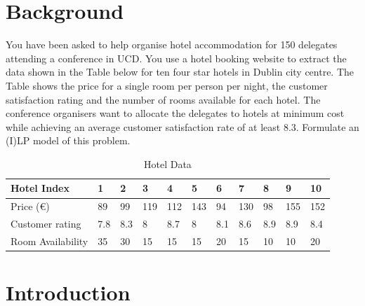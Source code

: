 \documentclass[paper=a4, fontsize=11pt]{scrartcl} %
\begin{document}
\section{Background}
You have been asked to help organise hotel accommodation for 150 delegates
attending a conference in UCD. You use a hotel booking website to extract the data
shown in the Table below for ten four star hotels in Dublin city centre. The Table
shows the price for a single room per person per night, the customer satisfaction
rating and the number of rooms available for each hotel. The conference organisers
want to allocate the delegates to hotels at minimum cost while achieving an average
customer satisfaction rate of at least 8.3. Formulate an (I)LP model of this problem. 

\begin{table}[ht]
\centering
\begin{tabular}{@{}|l|l|l|l|l|l|l|l|l|l|l|@{}}
\toprule
Hotel Index       & 1   & 2   & 3   & 4   & 5   & 6   & 7   & 8   & 9   & 10  \\ \midrule
Price (\euro)     & 89  & 99  & 119 & 112 & 143 & 94  & 130 & 98  & 155 & 152 \\ \midrule
Customer rating   & 7.8 & 8.3 & 8   & 8.7 & 8   & 8.1 & 8.6 & 8.9 & 8.9 & 8.4 \\ \midrule
Room Availability & 35  & 30  & 15  & 15  & 15  & 20  & 15  & 10  & 10  & 20  \\ \bottomrule
\end{tabular}
\caption{Hotel Data}
\label{hoteldata}
\end{table}



\section{Introduction}
\end{document}
